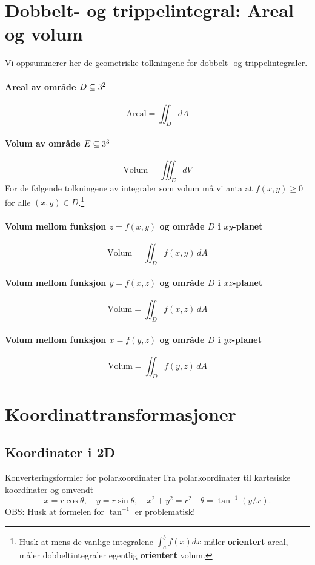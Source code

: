 \section{Dobbelt- og trippelintegral: Areal og volum}
Vi oppsummerer her de geometriske tolkningene for dobbelt- og trippelintegraler.

\paragraph{Areal av område $D \subseteq 3^2$}
\[
\text{Areal} = \iint_D dA
\]

\paragraph{Volum av område $E\subseteq 3^3$}
\[
\text{Volum} = \iiint_E dV
\]
For de følgende tolkningene av integraler som volum må vi anta at $f(x,y)\geq 0$ for alle $(x,y) \in D$.\footnote{Husk at mens de vanlige integralene $\int_a^b f(x)dx$ måler \textbf{orientert} areal, måler dobbeltintegraler egentlig \textbf{orientert} volum.}
\paragraph{Volum mellom funksjon $z = f(x, y)$ og område $D$ i $xy$-planet}
\[
\text{Volum} = \iint_D f(x, y)\, dA
\]

\paragraph{Volum mellom funksjon $y = f(x, z)$ og område $D$ i $xz$-planet}
\[
\text{Volum} = \iint_D f(x, z)\, dA
\]

\paragraph{Volum mellom funksjon $x = f(y, z)$ og område $D$ i $yz$-planet}
\[
\text{Volum} = \iint_D f(y, z)\, dA
\]

\newpage

\section{Koordinattransformasjoner}\label{sect:koordinater}
\subsection*{Koordinater i 2D}

\begin{oppsum}{Konverteringsformler for polarkoordinater}
Fra polarkoordinater til kartesiske koordinater og omvendt
\[
x = r \cos \theta,\quad y = r \sin \theta,\quad x^2 + y^2 = r^2 \quad \theta = \tan^{-1}\left(y/x\right).
\]
OBS: Husk at formelen for $\tan^{-1}$ er problematisk!
\end{oppsum}


